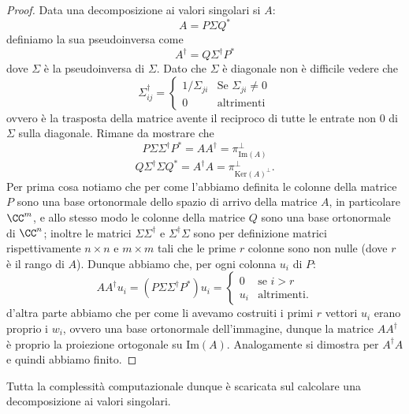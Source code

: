 \documentclass[11pt]{scrartcl}
\newcommand{\Immagine}[1]{\text{Im}\left(#1\right)}
\renewcommand{\ker}[1]{\text{Ker}\left(#1\right)}
\begin{document}
   	 \begin{proof}
   	 	Data una decomposizione ai valori singolari si $A$:
   	 	$$A=P\Sigma Q^*$$
   	 	definiamo la sua pseudoinversa come
   	 	$$A^\dagger=Q\Sigma^\dagger P^*$$
   	 	dove $\Sigma$ è la pseudoinversa di $\Sigma$. Dato che $\Sigma$ è diagonale non è difficile vedere che
   	 	$$\Sigma_{ij}^\dagger=
   	 	\begin{cases}
	   	 	1/\Sigma_{ji} & \text{Se $\Sigma_{ji}\ne 0$} \\
	   	 	0 & \text{altrimenti}
   	 	\end{cases}
   	 	$$
   	 	ovvero è la trasposta della matrice avente il reciproco di tutte le entrate non $0$ di $\Sigma$ sulla diagonale.
   	 	Rimane da mostrare che
   	 	$$P\Sigma \Sigma^\dagger P^*=AA^\dagger=\pi_{\Immagine{A}}^\perp$$
   	 	$$Q\Sigma^\dagger \Sigma Q^*=A^\dagger A=\pi_{\ker{A}^\perp}^\perp.$$
   	 	Per prima cosa notiamo che per come l'abbiamo definita le colonne della matrice $P$ sono una base ortonormale dello spazio di arrivo della matrice $A$, in particolare $\CC^m$, e allo stesso modo le colonne della matrice $Q$ sono una base ortonormale di $\CC^n$; inoltre le matrici $\Sigma\Sigma^\dagger$ e $\Sigma^\dagger\Sigma$ sono per definizione matrici rispettivamente $n\times n$ e $m\times m$ tali che le prime $r$ colonne sono non nulle (dove $r$ è il rango di $A$). Dunque abbiamo che, per ogni colonna $u_i$ di $P$:
   	 	$$AA^\dagger u_i=\left(P\Sigma \Sigma^\dagger P^*\right)u_i=
   	 	\begin{cases}
   	 		0 & \text{se $i>r$} \\
   	 		u_i & \text{altrimenti.}
   	 	\end{cases}$$
   	 	d'altra parte abbiamo che per come li avevamo costruiti i primi $r$ vettori $u_i$ erano proprio i $w_i$, ovvero una base ortonormale dell'immagine, dunque la matrice $AA^\dagger$ è proprio la proiezione ortogonale su $\Immagine{A}$. Analogamente si dimostra per $A^\dagger A$ e quindi abbiamo finito.
   	 \end{proof}
   	 Tutta la complessità computazionale dunque è scaricata sul calcolare una decomposizione ai valori singolari.
   	 
\end{document}

